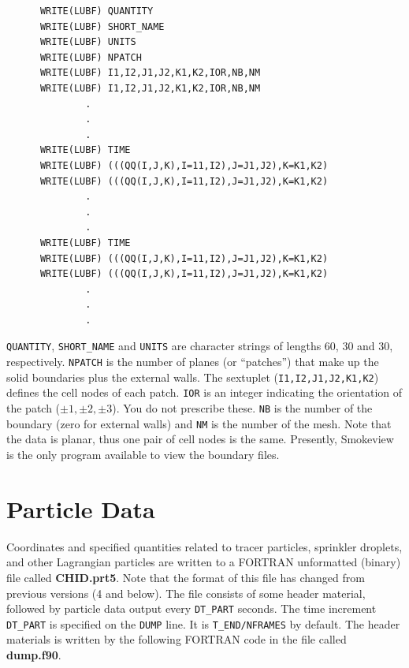 \documentclass[11pt]{book}
\newcommand{\ct}{\tt\small}
\begin{document}
\footnotesize
\begin{verbatim}
      WRITE(LUBF) QUANTITY
      WRITE(LUBF) SHORT_NAME
      WRITE(LUBF) UNITS
      WRITE(LUBF) NPATCH
      WRITE(LUBF) I1,I2,J1,J2,K1,K2,IOR,NB,NM
      WRITE(LUBF) I1,I2,J1,J2,K1,K2,IOR,NB,NM
              .
              .
              .
      WRITE(LUBF) TIME
      WRITE(LUBF) (((QQ(I,J,K),I=11,I2),J=J1,J2),K=K1,K2)
      WRITE(LUBF) (((QQ(I,J,K),I=11,I2),J=J1,J2),K=K1,K2)
              .
              .
              .
      WRITE(LUBF) TIME
      WRITE(LUBF) (((QQ(I,J,K),I=11,I2),J=J1,J2),K=K1,K2)
      WRITE(LUBF) (((QQ(I,J,K),I=11,I2),J=J1,J2),K=K1,K2)
              .
              .
              .
\end{verbatim}
\normalsize
{\ct QUANTITY}, {\ct SHORT\_NAME} and {\ct UNITS} are character
strings of lengths 60, 30 and 30, respectively.
{\ct NPATCH} is the number of planes (or ``patches'') that make up the
solid boundaries plus the external walls.
The sextuplet ({\ct I1,I2,J1,J2,K1,K2}) defines the cell nodes of each
patch. {\ct IOR} is an integer indicating the orientation of the
patch ($\pm 1,\pm 2,\pm 3$). You do not prescribe these.
{\ct NB} is the number of the boundary (zero for external walls) and
{\ct NM} is the number of the mesh.  Note that the data is planar,
thus one pair of cell nodes is the same. Presently, Smokeview is the
only program available to view the boundary files.

\section{Particle Data}
\label{out:PART}

Coordinates and specified quantities related to tracer particles, sprinkler droplets, and other Lagrangian particles are written
to a FORTRAN unformatted (binary) file called {\bf CHID.prt5}.
Note that the format of this file has changed from previous versions (4 and below).
The file consists of some header material, followed by particle data output every
{\ct DT\_PART} seconds. The time increment {\ct DT\_PART} is specified on the
{\ct DUMP} line. It is {\ct T\_END/NFRAMES} by default.
The header materials is written by the following FORTRAN code in the file called {\bf dump.f90}.
\end{document}
